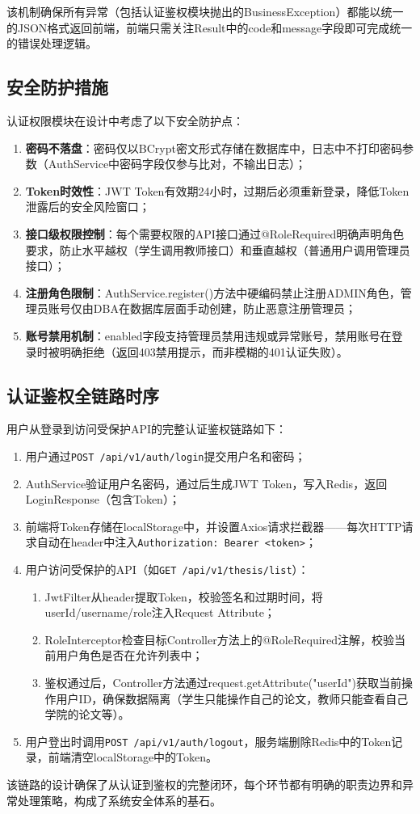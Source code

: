 该机制确保所有异常（包括认证鉴权模块抛出的BusinessException）都能以统一的JSON格式返回前端，前端只需关注Result中的code和message字段即可完成统一的错误处理逻辑。

\subsection{安全防护措施}

认证权限模块在设计中考虑了以下安全防护点：

\begin{enumerate}
    \item \textbf{密码不落盘}：密码仅以BCrypt密文形式存储在数据库中，日志中不打印密码参数（AuthService中密码字段仅参与比对，不输出日志）；
    \item \textbf{Token时效性}：JWT Token有效期24小时，过期后必须重新登录，降低Token泄露后的安全风险窗口；
    \item \textbf{接口级权限控制}：每个需要权限的API接口通过@RoleRequired明确声明角色要求，防止水平越权（学生调用教师接口）和垂直越权（普通用户调用管理员接口）；
    \item \textbf{注册角色限制}：AuthService.register()方法中硬编码禁止注册ADMIN角色，管理员账号仅由DBA在数据库层面手动创建，防止恶意注册管理员；
    \item \textbf{账号禁用机制}：enabled字段支持管理员禁用违规或异常账号，禁用账号在登录时被明确拒绝（返回403禁用提示，而非模糊的401认证失败）。
\end{enumerate}

\subsection{认证鉴权全链路时序}

用户从登录到访问受保护API的完整认证鉴权链路如下：

\begin{enumerate}
    \item 用户通过\verb|POST /api/v1/auth/login|提交用户名和密码；
    \item AuthService验证用户名密码，通过后生成JWT Token，写入Redis，返回LoginResponse（包含Token）；
    \item 前端将Token存储在localStorage中，并设置Axios请求拦截器——每次HTTP请求自动在header中注入\verb|Authorization: Bearer <token>|；
    \item 用户访问受保护的API（如\verb|GET /api/v1/thesis/list|）：
    \begin{enumerate}
        \item[(a)] JwtFilter从header提取Token，校验签名和过期时间，将userId/username/role注入Request Attribute；
        \item[(b)] RoleInterceptor检查目标Controller方法上的@RoleRequired注解，校验当前用户角色是否在允许列表中；
        \item[(c)] 鉴权通过后，Controller方法通过request.getAttribute("userId")获取当前操作用户ID，确保数据隔离（学生只能操作自己的论文，教师只能查看自己学院的论文等）。
    \end{enumerate}
    \item 用户登出时调用\verb|POST /api/v1/auth/logout|，服务端删除Redis中的Token记录，前端清空localStorage中的Token。
\end{enumerate}

该链路的设计确保了从认证到鉴权的完整闭环，每个环节都有明确的职责边界和异常处理策略，构成了系统安全体系的基石。
